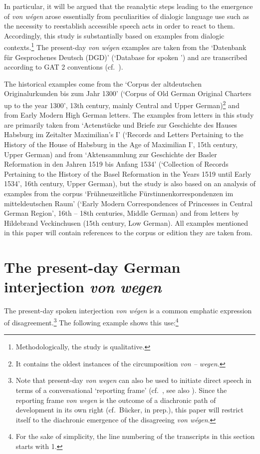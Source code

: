 \documentclass[output=paper
  ,nobabel
  ,draftmode
  ,babelshorthands
  ,colorlinks, citecolor=brown
]{langscibook}
\begin{document}
In particular, it will be argued that the reanalytic steps leading to the emergence of \emph{von wégen} arose essentially from peculiarities of dialogic language use such as the necessity to reestablish accessible speech acts in order to react to them. Accordingly, this study is substantially based on examples from dialogic contexts.\footnote{Methodologically, the study is qualitative.} The present-day \emph{von wégen} examples are taken from the `Datenbank für Gesprochenes Deutsch (DGD)' (`Database for spoken ') and are transcribed according to GAT 2 conventions (cf.\ \citealp{Selting2009}).

The historical examples come from the `Corpus der altdeutschen Originalur\-kunden bis zum Jahr 1300'
(`Corpus of Old German Original Charters up to the year 1300', 13th century, mainly
Central and Upper German)\footnote{It contains the  oldest
  instances of the circumposition \emph{von -- wegen.}}  and from Early Modern High
German letters. The examples from letters in this study are primarily
taken from `Actenstücke und Briefe zur Geschichte des Hauses Habsburg im Zeitalter Maximilian’s I'
(`Records and Letters Pertaining to the History of the House of Habsburg in the Age of
Maximilian I', 15th century, Upper German) and from `Aktensammlung zur Geschichte
der Basler Reformation in den Jahren 1519 bis Anfang 1534' (`Collection of Records Pertaining to the
History of the Basel Reformation in the Years 1519 until Early 1534', 16th century, Upper
German), but the study is also based on an analysis of examples from the corpus
`Frühneuzeitliche Fürstinnenkorrespondenzen im mitteldeutschen Raum' (`Early Modern Correspondences
of Princesses in Central German Region', 16th -- 18th centuries, Middle German) and from letters by Hildebrand Veckinchusen (15th century, Low German). All examples mentioned in this paper will contain references to the corpus or edition they are taken from.

\section{The present-day German interjection \emph{von wegen}}\label{sec-pres-vw}

The present-day spoken  interjection \emph{von wégen} is a common emphatic expression of
disagreement.\footnote{Note that present-day  \emph{von wegen} can also be used to initiate
  direct speech in terms of a conversational `reporting frame' (cf.\ \citealp{Buecker2009,
    Buecker2013}, see also \citealp[307–310]{Androutsopoulos1998}). Since the reporting frame \emph{von wegen} is the outcome of a diachronic path of development in its own right (cf.\ Bücker, in prep.), this paper will restrict itself to the diachronic emergence of the disagreeing \emph{von wégen}.} The following example shows this use:\footnote{For the sake of simplicity, the line numbering of the transcripts in this section starts with 1.}
\end{document}
